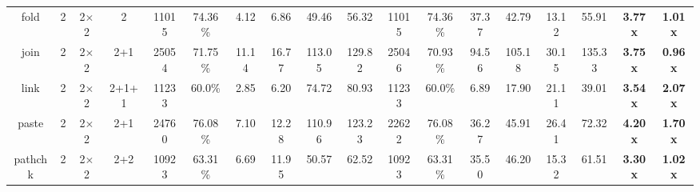 \begin{table*}[t]
{\begin{tabular}{cccc|cccccc|cccccccc}
  fold    &          2 &        2$\times$2 &        2 &      11015 &       74.36\% &            4.12 &             6.86 &          49.46 &           56.32 &        11015 &         74.36\% &             37.37 &              42.79 &            13.12 &             55.91 &        \textbf{3.77x} &         \textbf{1.01x} \\
  join    &          2 &        2$\times$2 &      2+1 &      25054 &       71.75\% &           11.14 &            16.77 &         113.05 &          129.82 &        25046 &         70.93\% &             94.56 &             105.18 &            30.15 &            135.33 &        \textbf{3.75x} &         \textbf{0.96x} \\
  link    &          2 &        2$\times$2 &    2+1+1 &      11233 &        60.0\% &            2.85 &             6.20 &          74.72 &           80.93 &        11233 &          60.0\% &              6.89 &              17.90 &            21.11 &             39.01 &        \textbf{3.54x} &         \textbf{2.07x} \\
  paste   &          2 &        2$\times$2 &      2+1 &      24760 &       76.08\% &            7.10 &            12.28 &         110.96 &          123.23 &        22622 &         76.08\% &             36.27 &              45.91 &            26.41 &             72.32 &        \textbf{4.20x} &         \textbf{1.70x} \\
  pathchk &          2 &        2$\times$2 &      2+2 &      10923 &       63.31\% &            6.69 &            11.95 &          50.57 &           62.52 &        10923 &         63.31\% &             35.50 &              46.20 &            15.32 &             61.51 &        \textbf{3.30x} &         \textbf{1.02x} \\ \bottomrule
  \end{tabular}
  }
  \vspace{-1em}
  \end{table*}